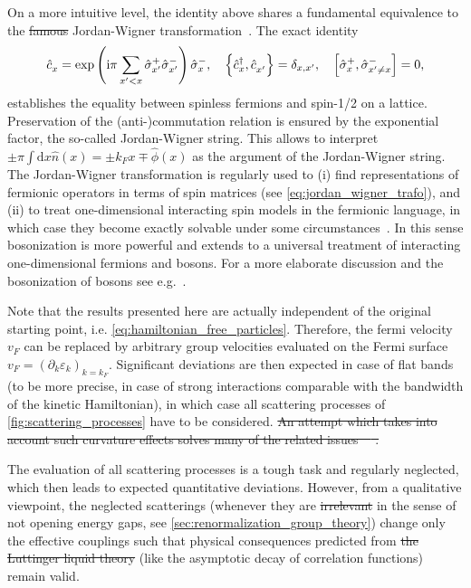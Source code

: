 \documentclass{svmono}
\def\ri{\mathrm i}
\def\rd{\mathrm d}
\def\pdag{{\vphantom\dag}}
\newcommand{\commutator}[1]{\left[ #1 \right]}
\newcommand{\anticommutator}[1]{\left\{ #1 \right\}}
\newcommand{\brlr}[1]{\left( #1 \right)}
\providecommand{\DIFaddtex}[1]{{\protect\color{blue}\uwave{#1}}} %
\providecommand{\DIFdeltex}[1]{{\protect\color{red}\sout{#1}}}                      %
\providecommand{\DIFaddbegin}{} %
\providecommand{\DIFaddend}{} %
\providecommand{\DIFdelbegin}{} %
\providecommand{\DIFdelend}{} %
\providecommand{\DIFadd}[1]{\texorpdfstring{\DIFaddtex{#1}}{#1}} %
\providecommand{\DIFdel}[1]{\texorpdfstring{\DIFdeltex{#1}}{}} %
\newcommand{\DIFscaledelfig}{0.5}
\newlength{\DIFdelgraphicswidth} %
\newlength{\DIFdelgraphicsheight} %
\newcommand{\DIFaddincludegraphics}[2][]{{\color{blue}\fbox{\DIFOincludegraphics[#1]{#2}}}} %
\newcommand{\DIFdelincludegraphics}[2][]{%
\sbox{\DIFdelgraphicsbox}{\DIFOincludegraphics[#1]{#2}}%
\settoboxwidth{\DIFdelgraphicswidth}{\DIFdelgraphicsbox} %
\settoboxtotalheight{\DIFdelgraphicsheight}{\DIFdelgraphicsbox} %
\scalebox{\DIFscaledelfig}{%
\parbox[b]{\DIFdelgraphicswidth}{\usebox{\DIFdelgraphicsbox}\\[-\baselineskip] \rule{\DIFdelgraphicswidth}{0em}}\llap{\resizebox{\DIFdelgraphicswidth}{\DIFdelgraphicsheight}{%
\setlength{\unitlength}{\DIFdelgraphicswidth}%
\begin{picture}(1,1)%
\thicklines\linethickness{2pt} %
{\color[rgb]{1,0,0}\put(0,0){\framebox(1,1){}}}%
{\color[rgb]{1,0,0}\put(0,0){\line( 1,1){1}}}%
{\color[rgb]{1,0,0}\put(0,1){\line(1,-1){1}}}%
\end{picture}%
}\hspace*{3pt}}} %
} %
\DeclareRobustCommand{\DIFaddbegin}{\DIFOaddbegin \let\includegraphics\DIFaddincludegraphics} %
\DeclareRobustCommand{\DIFaddend}{\DIFOaddend \let\includegraphics\DIFOincludegraphics} %
\DeclareRobustCommand{\DIFdelbegin}{\DIFOdelbegin \let\includegraphics\DIFdelincludegraphics} %
\DeclareRobustCommand{\DIFdelend}{\DIFOaddend \let\includegraphics\DIFOincludegraphics} %
\begin{document}
On a more intuitive level, the identity above shares a fundamental equivalence to the \DIFdelbegin \DIFdel{famous }\DIFdelend Jordan-Wigner transformation~\cite{Jordan1928}.
The exact identity
\begin{align}
    \hat c^\pdag_x=\exp\brlr{\ri\pi\sum_{x'<x}\hat \sigma^+_{x'}\hat \sigma^-_{x'}}\hat \sigma^-_x
    ,\quad
    \anticommutator{\hat c^\dag_x,\hat c^\pdag_{x'}}=\delta_{x,x'}
    ,\quad
    \commutator{\hat \sigma^+_x,\hat \sigma^-_{x'\neq x}}=0
    ,
\end{align}
establishes the equality between spinless fermions and spin-1/2 on a lattice.
Preservation of the (anti-)commutation relation is ensured by the exponential factor, the so-called Jordan-Wigner string.
This allows to interpret $\pm\pi\int\rd x\hat n(x) = \pm k_F x\mp\hat\phi(x)$ as the argument of the Jordan-Wigner string.
The Jordan-Wigner transformation is regularly used to (i) find representations of fermionic operators in terms of spin matrices (see \cref{eq:jordan_wigner_trafo}), and (ii) to treat one-dimensional interacting spin models in the fermionic language, in which case they become exactly solvable under some circumstances~\cite{Lieb1961}.
In this sense bosonization is more powerful and extends to a universal treatment of interacting one-dimensional fermions and bosons.
For a more elaborate discussion and the bosonization of bosons see e.g.~\cite{Cazalilla2004}.


Note that the results presented here are actually independent of the original starting point, i.e. \cref{eq:hamiltonian_free_particles}.
Therefore, the fermi velocity $v_F$ can be replaced by arbitrary group velocities evaluated on the Fermi surface $v_F=(\partial_k\varepsilon_k)_{k=k_F}$.
Significant deviations are then expected in case of flat bands (to be more precise, in case of strong interactions comparable with the bandwidth of the kinetic Hamiltonian), in which case all scattering processes of \cref{fig:scattering_processes} have to be considered.
\DIFdelbegin \DIFdel{An attempt which takes into account such curvature effects solves many of the related issues~\mbox{%
\cite{Imambekov2009}}\hspace{0pt}%
.
}\DIFdelend 

The evaluation of all scattering processes is a tough task and regularly neglected, which then leads to expected quantitative deviations.
However, from a qualitative viewpoint, the neglected scatterings (whenever they are \DIFdelbegin \DIFdel{irrelevant }\DIFdelend \DIFaddbegin \DIFadd{truly ``irrelevant'' }\DIFaddend in the sense of not opening energy gaps, see \cref{sec:renormalization_group_theory}) change only the effective couplings such that physical consequences predicted from \DIFdelbegin \DIFdel{the Luttinger liquid theory }\DIFdelend \DIFaddbegin \DIFadd{abelian bosonization }\DIFaddend (like the asymptotic decay of correlation functions) remain valid.
\end{document}
